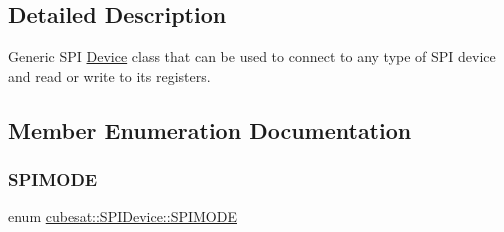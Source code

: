 \subsection{Detailed Description}
Generic S\+PI \hyperlink{classcubesat_1_1Device}{Device} class that can be used to connect to any type of S\+PI device and read or write to its registers. 

\subsection{Member Enumeration Documentation}
\mbox{\label{classcubesat_1_1SPIDevice_a68ceaba3194595c2f995f052a337a6d2}} 
\subsubsection{\texorpdfstring{S\+P\+I\+M\+O\+DE}{SPIMODE}}
{\footnotesize\ttfamily enum \hyperlink{classcubesat_1_1SPIDevice_a68ceaba3194595c2f995f052a337a6d2}{cubesat\+::\+S\+P\+I\+Device\+::\+S\+P\+I\+M\+O\+DE}}


